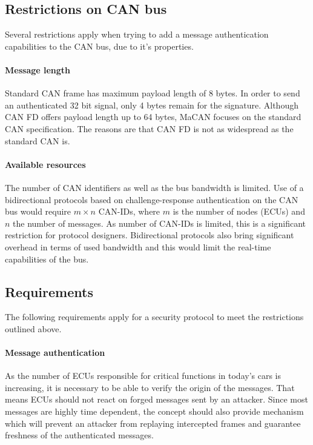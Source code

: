 \documentclass{article}
\begin{document}
\subsection{Restrictions on CAN bus}

Several restrictions apply when trying to add a message authentication capabilities to the CAN bus, due to it's properties.

\paragraph{Message length}

Standard CAN frame has maximum payload length of 8 bytes. In order to send an authenticated 32 bit signal, only 4 bytes remain for the signature. Although CAN FD offers payload length up to 64 bytes, MaCAN focuses on the standard CAN specification. The reasons are that CAN FD is not as widespread as the standard CAN is.

\paragraph{Available resources}

The number of CAN identifiers as well as the bus bandwidth is limited. Use of a bidirectional protocols based on challenge-response authentication on the CAN bus would require $m \times n$ CAN-IDs, where $m$ is the number of nodes (ECUs) and $n$ the number of messages. As number of CAN-IDs is limited, this is a significant restriction for protocol designers. Bidirectional protocols  also bring significant overhead in terms of used bandwidth and this would limit the real-time capabilities of the bus.

\subsection{Requirements}

The following requirements apply for a security protocol to meet the restrictions outlined above.

\paragraph{Message authentication}

As the number of ECUs responsible for critical functions in today's cars is increasing, it is necessary to be able to verify the origin of the messages. That means ECUs should not react on forged messages sent by an attacker. Since most messages are highly time dependent, the concept should also provide mechanism which will prevent an attacker from replaying intercepted frames and guarantee freshness of the authenticated messages.
\end{document}
